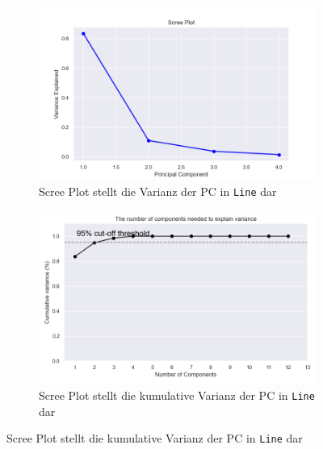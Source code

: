 \begin{figure}
    \ContinuedFloat
    \begin{subfigure}{.5\textwidth}
        \includegraphics[width=\textwidth]{images/30_results/line-scree.png}
        \caption{Scree Plot stellt die Varianz der PC in \texttt{Line} dar}
        \label{fig:scree-line}
    \end{subfigure}%
    \begin{subfigure}{.5\textwidth}
        \includegraphics[width=\textwidth]{images/30_results/line-scree-cum.png}
        \caption{Scree Plot stellt die kumulative Varianz der PC in \texttt{Line} dar}
        \label{fig:scree-cum-line}
    \end{subfigure}


\end{figure}
